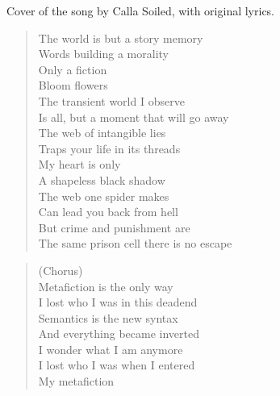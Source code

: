 \phantom{;}
\clearpage



Cover of the song by Calla Soiled, with original lyrics.


\begin{minipage}{0.5\textwidth}
    \begin{verse}
    The world is but a story memory \\
	Words building a morality \\
	Only a fiction \\
	Bloom flowers \\
	The transient world I observe \\
	Is all, but a moment that will go away \\
	The web of intangible lies \\
	Traps your life in its threads \\
	My heart is only \\
	A shapeless black shadow \\
	The web one spider makes \\
	Can lead you back from hell \\
	But crime and punishment are \\
	The same prison cell there is no escape
    \end{verse}

    \begin{verse}
    (Chorus) \\
	Metafiction is the only way \\
	I lost who I was in this deadend \\
	Semantics is the new syntax \\
	And everything became inverted \\
	I wonder what I am anymore \\
	I lost who I was when I entered \\
	My metafiction
    \end{verse}

\end{minipage}
